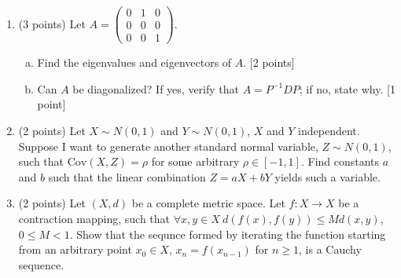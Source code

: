 \documentclass[12pt]{article}
\begin{document}
\begin{enumerate}[1.]
\begin{multicols}{3}
\begin{enumerate}[a)]
\end{enumerate}
\end{multicols}


\item (3 points) Let $A = \begin{pmatrix} 0 & 1 & 0 \\ 0 & 0 &  0 \\ 0 & 0 & 1\end{pmatrix}$.
\begin{enumerate}[a)]
	\item Find the eigenvalues and eigenvectors of $A$. [2 points]
	\item Can $A$ be diagonalized? If yes, verify that $A = P^{-1}DP$; if no, state why. [1 point]
\end{enumerate}



\item (2 points) Let $X \sim N(0, 1)$ and $Y \sim N(0, 1)$, $X$ and $Y$ independent. Suppose I want to generate another standard normal variable, $Z \sim N(0, 1)$, such that $\mathrm{Cov}(X, Z) = \rho$ for some arbitrary $\rho\in [-1, 1]$. Find constants $a$ and $b$ such that the linear combination $Z = aX + bY$ yields such a variable.

\item (2 points) Let $(X, d)$ be a complete metric space. Let $f:X \to X$ be a contraction mapping, such that $\forall x,y\in X \ d(f(x), f(y)) \leq M d(x,y)$, $0 \leq M < 1$. Show that the sequnce formed by iterating the function starting from an arbitrary point $x_{0}\in X$, $x_{n} = f(x_{n-1})$ for $n \geq 1$, is a Cauchy sequence.



\end{enumerate}
\end{document}
